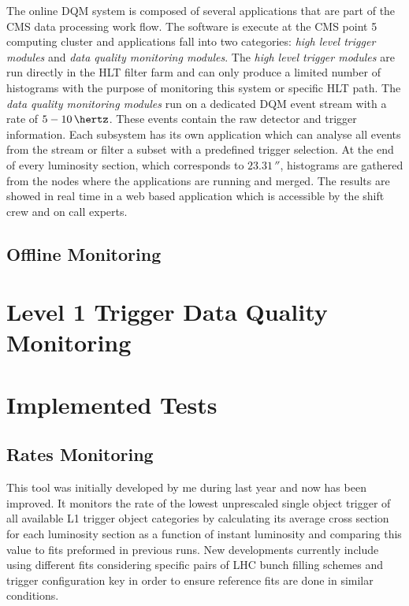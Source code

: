 The online \gls{DQM} system is composed of several applications that are part of the \gls{CMS} data processing work flow. The software is execute at the \gls{CMS} point 5 computing cluster and applications fall into two categories: \textit{high level trigger modules} and \textit{data quality monitoring modules}. The \textit{high level trigger modules} are run directly in the \gls{HLT} filter farm and can only produce a limited number of histograms with the purpose of monitoring this system or specific \gls{HLT} path. The \textit{data quality monitoring modules} run on a dedicated \gls{DQM} event stream with a rate of $5-10\,\hertz$. These events contain the raw detector and trigger information. Each subsystem has its own application which can analyse all events from the stream or filter a subset with a predefined trigger selection. At the end of every luminosity section, which corresponds to $23.31\,\second$, histograms are gathered from the nodes where the applications are running and merged. The results are showed in real time in a web based application which is accessible by the shift crew and on call experts.

\subsection{Offline Monitoring}



\section{Level 1 Trigger Data Quality Monitoring}

\section{Implemented Tests}

\subsection{Rates Monitoring}

This tool was initially developed by me during last year and now has been improved. It monitors the rate of the
lowest unprescaled single object trigger of all available L1 trigger object categories by calculating its
average cross section for each luminosity section as a function of instant luminosity and comparing this value to
fits preformed in previous runs. New developments currently include using different fits considering specific pairs of
LHC bunch filling schemes and trigger configuration key in order to ensure reference fits are done in similar conditions.

